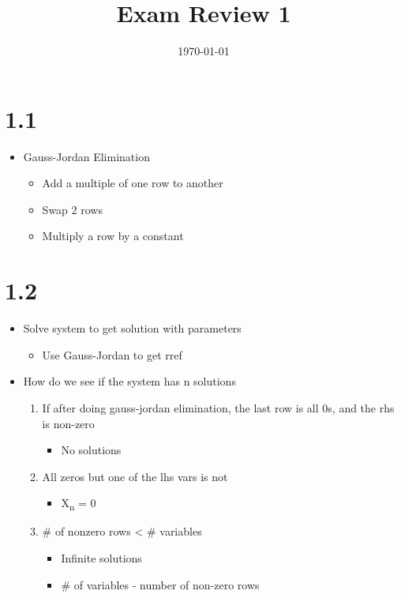 \documentclass[11pt]{article}
\date{\today}
\title{Exam Review 1}
\begin{document}
\maketitle
\tableofcontents

\section{1.1}
\label{sec:org8238c1f}
\begin{itemize}
\item Gauss-Jordan Elimination
\begin{itemize}
\item Add a multiple of one row to another
\item Swap 2 rows
\item Multiply a row by a constant
\end{itemize}
\end{itemize}
\section{1.2}
\label{sec:orgfe1a79a}
\begin{itemize}
\item Solve system to get solution with parameters
\begin{itemize}
\item Use Gauss-Jordan to get rref
\end{itemize}
\item How do we see if the system has n solutions
\begin{enumerate}
\item If after doing gauss-jordan elimination, the last row is all 0s, and the rhs is non-zero
\begin{itemize}
\item No solutions
\end{itemize}
\item All zeros but one of the lhs vars is not
\begin{itemize}
\item X\textsubscript{n} = 0
\end{itemize}
\item \# of nonzero rows < \# variables
\begin{itemize}
\item Infinite solutions
\item \# of variables - number of non-zero rows
\end{itemize}
\end{enumerate}
\end{itemize}
\end{document}
